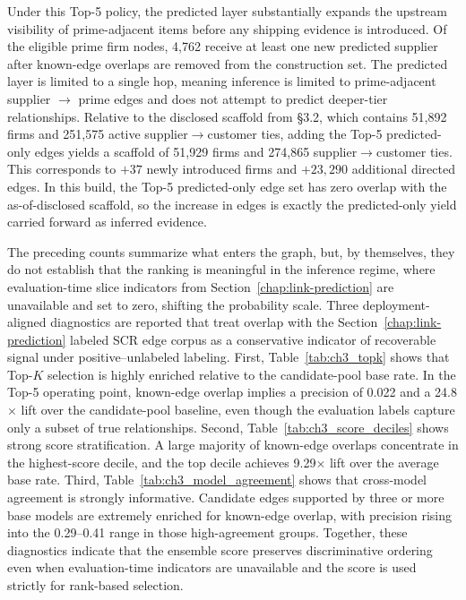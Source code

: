 Under this Top-5 policy, the predicted layer substantially expands the upstream visibility of prime-adjacent items before any shipping evidence is introduced. Of the \NumPrimes eligible prime firm nodes, 4{,}762 receive at least one new predicted supplier after known-edge overlaps are removed from the construction set. The predicted layer is limited to a single hop, meaning inference is limited to prime-adjacent supplier $\rightarrow$ prime edges and does not attempt to predict deeper-tier relationships. Relative to the disclosed scaffold from \S3.2, which contains 51{,}892 firms and 251{,}575 active supplier$\rightarrow$customer ties, adding the Top-5 predicted-only edges yields a scaffold of 51{,}929 firms and 274{,}865 supplier$\rightarrow$customer ties. This corresponds to $+37$ newly introduced firms and $+23{,}290$ additional directed edges. In this build, the Top-5 predicted-only edge set has zero overlap with the as-of-disclosed scaffold, so the increase in edges is exactly the predicted-only yield carried forward as inferred evidence.

The preceding counts summarize what enters the graph, but, by themselves, they do not establish that the ranking is meaningful in the inference regime, where evaluation-time slice indicators from Section~\ref{chap:link-prediction} are unavailable and set to zero, shifting the probability scale. Three deployment-aligned diagnostics are reported that treat overlap with the Section~\ref{chap:link-prediction} labeled SCR edge corpus as a conservative indicator of recoverable signal under positive--unlabeled labeling. First, Table~\ref{tab:ch3_topk} shows that Top-$K$ selection is highly enriched relative to the candidate-pool base rate. In the Top-5 operating point, known-edge overlap implies a precision of 0.022 and a 24.8$\times$ lift over the candidate-pool baseline, even though the evaluation labels capture only a subset of true relationships. Second, Table~\ref{tab:ch3_score_deciles} shows strong score stratification. A large majority of known-edge overlaps concentrate in the highest-score decile, and the top decile achieves 9.29$\times$ lift over the average base rate. Third, Table~\ref{tab:ch3_model_agreement} shows that cross-model agreement is strongly informative. Candidate edges supported by three or more base models are extremely enriched for known-edge overlap, with precision rising into the 0.29--0.41 range in those high-agreement groups. Together, these diagnostics indicate that the ensemble score preserves discriminative ordering even when evaluation-time indicators are unavailable and the score is used strictly for rank-based selection.


